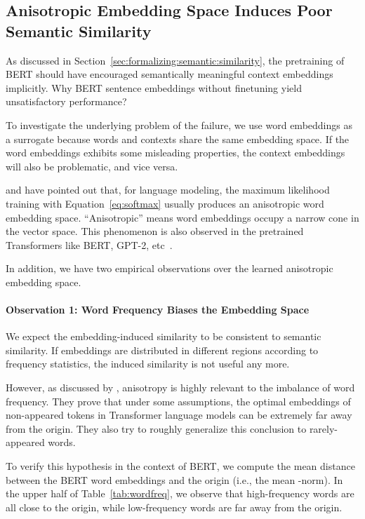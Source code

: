 \documentclass[11pt,a4paper]{article}
\begin{document}
\subsection{Anisotropic Embedding Space Induces Poor Semantic Similarity}
\label{sec:anisotropy}

As discussed in Section~\ref{sec:formalizing:semantic:similarity}, the pretraining of BERT should have encouraged semantically meaningful context embeddings implicitly. Why BERT sentence embeddings without finetuning yield unsatisfactory performance? 



To investigate the underlying problem of the failure, we use word embeddings as a surrogate because words and contexts share the same embedding space. If the word embeddings exhibits some misleading properties, the context embeddings will also be problematic, and vice versa.



\citet{gao2019representation} and \citet{wang2020spectrum} have pointed out that, for language modeling, the maximum likelihood training with Equation~\ref{eq:softmax} usually produces an anisotropic word embedding space. ``Anisotropic'' means word embeddings occupy a narrow cone in the vector space.
This phenomenon is also observed in the pretrained Transformers like BERT, GPT-2, etc~\cite{ethayarajh2019contextual}. 

In addition, we have two empirical observations over the learned anisotropic embedding space.

\paragraph{Observation 1: Word Frequency Biases the Embedding Space} 
\label{sec:h1}


We expect the embedding-induced similarity to be consistent to semantic similarity. If embeddings are distributed in different regions according to frequency statistics, the induced similarity is not useful any more.

However, as discussed by \citet{gao2019representation}, anisotropy is highly relevant to the imbalance of word frequency. They prove that under some assumptions, the optimal embeddings of non-appeared tokens in Transformer language models can be extremely far away from the origin. They also try to roughly generalize this conclusion to rarely-appeared words. 


To verify this hypothesis in the context of BERT, we compute the mean  distance between the BERT word embeddings and the origin (i.e., the mean -norm). In the upper half of Table~\ref{tab:wordfreq}, we observe that high-frequency words are all close to the origin, while low-frequency words are far away from the origin.
\end{document}
